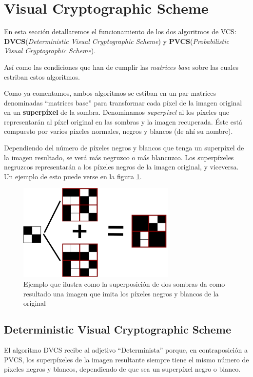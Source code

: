 \section[VCS]{Visual Cryptographic Scheme}
En esta sección detallaremos el funcionamiento de los dos algoritmos de VCS:
\textbf{DVCS}(\textsl{Deterministic Visual Cryptographic Scheme}) y
\textbf{PVCS}(\textsl{Probabilistic Visual Cryptographic Scheme}).

Así como las condiciones que han de cumplir las \textsl{matrices base} sobre las
cuales estriban estos algoritmos.

Como ya comentamos, ambos algoritmos se estiban en un par matrices denominadas
``matrices base'' para transformar cada píxel de la imagen original en un
\textbf{superpíxel} de la sombra. Denominamos \textsl{superpíxel} al los píxeles
que representarán al píxel original en las sombras y la imagen recuperada. Éste
está compuesto por varios píxeles normales, negros y blancos (de ahí su nombre).

Dependiendo del número de píxeles negros y blancos que tenga un superpíxel de la
imagen resultado, se verá más negruzco o más blancuzco. Los superpíxeles
negruzcos representarán a los píxeles negros de la imagen original, y viceversa.
Un ejemplo de esto puede verse en la figura \ref{fig:ejemploVCS}.

\begin{figure}[h]
	\centering
	\includegraphics[width=0.7\textwidth]{images/ejemploVCS}
	\caption{Ejemplo que ilustra como la superposición de dos sombras da
		como resultado una imagen que imita los píxeles negros y blancos
		de la original}
	\label{fig:ejemploVCS}
\end{figure}

\subsection[DVCS]{Deterministic Visual Cryptographic Scheme}
El algoritmo DVCS recibe al adjetivo ``Determinista'' porque, en contraposición
a PVCS, los superpíxeles de la imagen resultante siempre tiene el mismo número
de píxeles negros y blancos, dependiendo de que sea un superpíxel negro o
blanco.


